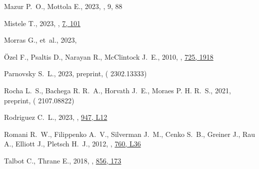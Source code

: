 \documentclass[fleqn,usenatbib,useAMS]{mnras}
\begin{document}
\begin{thebibliography}{}
Mazur P.~O.,  Mottola E.,  2023, , 9, 88

Mistele T.,  2023, , \href {https://ui.adsabs.harvard.edu/abs/2023RNAAS...7..101M} {7, 101}

Morras G.,  et~al., 2023, 

{{\"O}zel} F.,  {Psaltis} D.,  {Narayan} R.,   {McClintock} J.~E.,  2010, , \href {https://ui.adsabs.harvard.edu/abs/2010ApJ...725.1918O} {725, 1918}

Parnovsky S.~L.,  2023, preprint, \href {https://ui.adsabs.harvard.edu/abs/2023arXiv230213333P} {} ( {2302.13333})

Rocha L.~S.,  Bachega R. R.~A.,  Horvath J.~E.,   Moraes P. H. R.~S.,  2021, preprint, \href {https://ui.adsabs.harvard.edu/abs/2021arXiv210708822R} {} ( {2107.08822})

Rodriguez C.~L.,  2023, , \href {https://ui.adsabs.harvard.edu/abs/2023ApJ...947L..12R} {947, L12}

Romani R.~W.,  Filippenko A.~V.,  Silverman J.~M.,  Cenko S.~B.,  Greiner J.,  Rau A.,  Elliott J.,   Pletsch H.~J.,  2012, , \href {https://ui.adsabs.harvard.edu/abs/2012ApJ...760L..36R} {760, L36}

Talbot C.,  Thrane E.,  2018, , \href {https://ui.adsabs.harvard.edu/abs/2018ApJ...856..173T} {856, 173}


\end{thebibliography}
\end{document}

